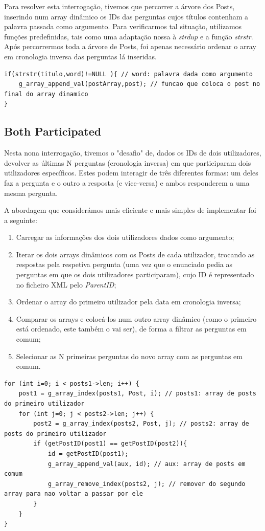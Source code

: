 \documentclass[a4paper, 11pt, oneside]{article}
\begin{document}
Para resolver esta interrogação, tivemos que percorrer a árvore dos Posts, inserindo num array dinâmico os IDs das perguntas cujos títulos contenham a palavra passada como argumento. Para verificarmos tal situação, utilizamos funções predefinidas, tais como uma adaptação nossa à \textit{strdup} e a função \textit{strstr}. Após percorrermos toda a árvore de Posts, foi apenas necessário ordenar o array em cronologia inversa das perguntas lá inseridas.
\begin{lstlisting}[caption=Query 8 - comparação do título e da palavra dada como argumento]
if(strstr(titulo,word)!=NULL ){ // word: palavra dada como argumento
	g_array_append_val(postArray,post); // funcao que coloca o post no final do array dinamico
}
\end{lstlisting}

\subsection{Both Participated}
Nesta nona interrogação, tivemos o "desafio" de, dados os IDs de dois utilizadores, devolver as últimas N perguntas (cronologia inversa) em que participaram dois utilizadores específicos. Estes podem interagir de três diferentes formas: um deles faz a pergunta e o outro a resposta (e vice-versa) e ambos responderem a uma mesma pergunta.

A abordagem que considerámos mais eficiente e mais simples de implementar foi a seguinte:
\begin{enumerate}
\item Carregar as informações dos dois utilizadores dados como argumento;
\item Iterar os dois arrays dinâmicos com os Posts de cada utilizador, trocando as respostas pela respetiva pergunta (uma vez que o enunciado pedia as perguntas em que os dois utilizadores participaram), cujo ID é representado no ficheiro XML pelo \textit{ParentID};
\item Ordenar o array do primeiro utilizador pela data em cronologia inversa;
\item Comparar os arrays e colocá-los num outro array dinâmico (como o primeiro está ordenado, este também o vai ser), de forma a filtrar as perguntas em comum;
\item Selecionar as N primeiras perguntas do novo array com as perguntas em comum.
\end{enumerate}
\begin{lstlisting}[caption=Query 9 - comparação dos dois arrays de Posts de cada utilizador]
for (int i=0; i < posts1->len; i++) {
	post1 = g_array_index(posts1, Post, i); // posts1: array de posts do primeiro utilizador
	for (int j=0; j < posts2->len; j++) {
		post2 = g_array_index(posts2, Post, j); // posts2: array de posts do primeiro utilizador
		if (getPostID(post1) == getPostID(post2)){
			id = getPostID(post1);
			g_array_append_val(aux, id); // aux: array de posts em comum
			g_array_remove_index(posts2, j); // remover do segundo array para nao voltar a passar por ele
		}
	}
}
\end{lstlisting}
\end{document}

